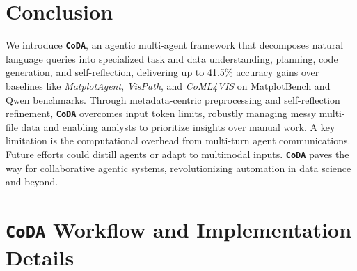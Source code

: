 \documentclass[11pt, a4paper, logo, copyright]{googlecloud}
\newcommand{\methodname}{\textbf{\texttt{\textcolor{StarIndigo}{C}\textcolor{StarIndigo}{o}\textcolor{StarCoral}{D}\textcolor{StarTeal}{A}}}}
\begin{document}
\section{Conclusion}

We introduce \methodname{}, an agentic multi-agent framework that decomposes natural language queries into specialized task and data understanding, planning, code generation, and self-reflection, delivering up to 41.5\% accuracy gains over baselines like \textit{MatplotAgent}, \textit{VisPath}, and \textit{CoML4VIS} on MatplotBench and Qwen benchmarks. 
Through metadata-centric preprocessing and self-reflection refinement, \methodname{} overcomes input token limits, robustly managing messy multi-file data and enabling analysts to prioritize insights over manual work.
A key limitation is the computational overhead from multi-turn agent communications. Future efforts could distill agents or adapt to multimodal inputs. \methodname{} paves the way for collaborative agentic systems, revolutionizing automation in data science and beyond.





\nobibliography*


\clearpage

\appendix




\section{\methodname{} Workflow and Implementation Details}
\end{document}
